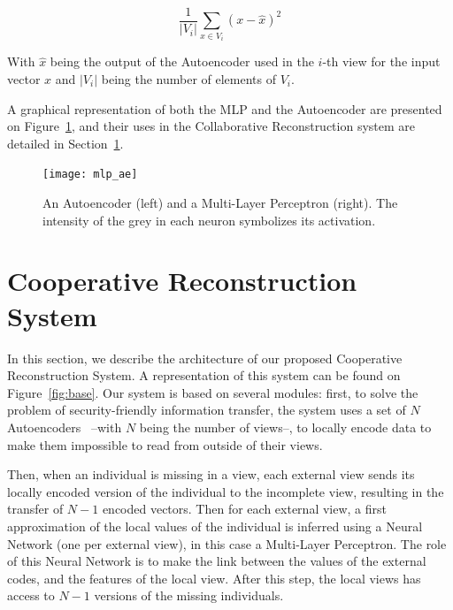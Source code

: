 		\begin{equation}
            \frac{1}{|V_i|}\sum_{x \in V_i}{(x - \hat{x})}^2
		\end{equation}
		
        With $\hat{x}$ being the output of the Autoencoder used in the $i$-th view for the input vector $x$ and $|V_i|$ being the number of elements of $V_i$.

    A graphical representation of both the MLP and the Autoencoder are presented on Figure~\ref{fig:mlp_ae}, and their uses in the Collaborative Reconstruction system are detailed in Section~\ref{sec:crs}.

    \begin{figure}[h]
        \centering
        \texttt{[image: mlp\_ae]}
        \caption{An Autoencoder (left) and a Multi-Layer Perceptron (right). The intensity of the grey in each neuron symbolizes its activation.}
\label{fig:mlp_ae}
    \end{figure}
    
	\section{Cooperative Reconstruction System}
\label{sec:crs}
	
In this section, we describe the architecture of our proposed Cooperative Reconstruction System. A representation of this system can be found on Figure~\ref{fig:base}. Our system is based on several modules: first, to solve the problem of security-friendly information transfer, the system uses a set of $N$ Autoencoders~\cite{hinton2006reducing} --with $N$ being the number of views--, to locally encode data to make them impossible to read from outside of their views.
	
Then, when an individual is missing in a view, each external view sends its locally encoded version of the individual to the incomplete view, resulting in the transfer of $N-1$ encoded vectors. Then for each external view, a first approximation of the local values of the individual is inferred using a Neural Network (one per external view), in this case a Multi-Layer Perceptron. The role of this Neural Network is to make the link between the values of the external codes, and the features of the local view. After this step, the local views has access to $N-1$ versions of the missing individuals.
	
